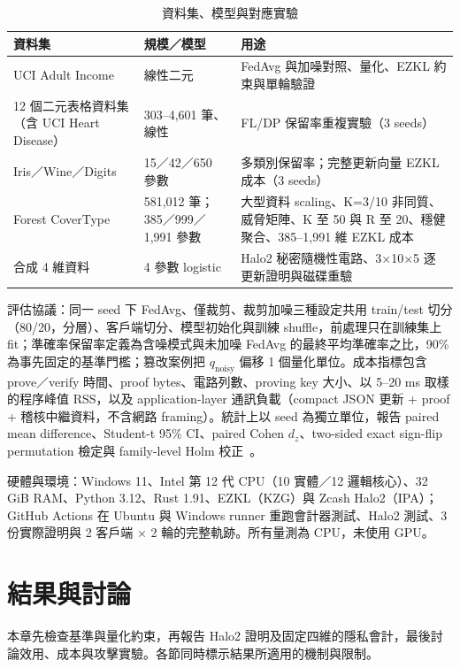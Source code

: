 \documentclass[12pt,a4paper]{article}
\newcommand{\qnoisy}{q_{\mathrm{noisy}}}
\begin{document}
\begin{table}[H]
\centering\small
\caption{資料集、模型與對應實驗}
\label{tab:datasets}
\begin{tabular}{P{3.6cm}P{3.2cm}P{7.6cm}}
\toprule
資料集 & 規模／模型 & 用途 \\
\midrule
UCI Adult Income & 線性二元 & FedAvg 與加噪對照、量化、EZKL 約束與單輪驗證 \\
12 個二元表格資料集（含 UCI Heart Disease） & 303--4,601 筆、線性 & FL/DP 保留率重複實驗（3 seeds） \\
Iris／Wine／Digits & 15／42／650 參數 & 多類別保留率；完整更新向量 EZKL 成本（3 seeds） \\
Forest CoverType & 581,012 筆；385／999／1,991 參數 & 大型資料 scaling、K=3/10 非同質、威脅矩陣、K 至 50 與 R 至 20、穩健聚合、385--1,991 維 EZKL 成本 \\
合成 4 維資料 & 4 參數 logistic & Halo2 秘密隨機性電路、3×10×5 逐更新證明與磁碟重驗 \\
\bottomrule
\end{tabular}
\end{table}

評估協議：同一 seed 下 FedAvg、僅裁剪、裁剪加噪三種設定共用 train/test 切分（80/20，分層）、客戶端切分、模型初始化與訓練 shuffle，前處理只在訓練集上 fit；準確率保留率定義為含噪模式與未加噪 FedAvg 的最終平均準確率之比，90\% 為事先固定的基準門檻；篡改案例把 $\qnoisy$ 偏移 1 個量化單位。成本指標包含 prove／verify 時間、proof bytes、電路列數、proving key 大小、以 5--20 ms 取樣的程序峰值 RSS，以及 application-layer 通訊負載（compact JSON 更新 + proof + 稽核中繼資料，不含網路 framing）。統計上以 seed 為獨立單位，報告 paired mean difference、Student-t 95\% CI、paired Cohen $d_z$、two-sided exact sign-flip permutation 檢定與 family-level Holm 校正~\cite{holm1979simple}。

硬體與環境：Windows 11、Intel 第 12 代 CPU（10 實體／12 邏輯核心）、32 GiB RAM、Python 3.12、Rust 1.91、EZKL（KZG）與 Zcash Halo2（IPA）；GitHub Actions 在 Ubuntu 與 Windows runner 重跑會計器測試、Halo2 測試、3 份實際證明與 2 客戶端 × 2 輪的完整軌跡。所有量測為 CPU，未使用 GPU。

\section{結果與討論}
本章先檢查基準與量化約束，再報告 Halo2 證明及固定四維的隱私會計，最後討論效用、成本與攻擊實驗。各節同時標示結果所適用的機制與限制。
\end{document}

